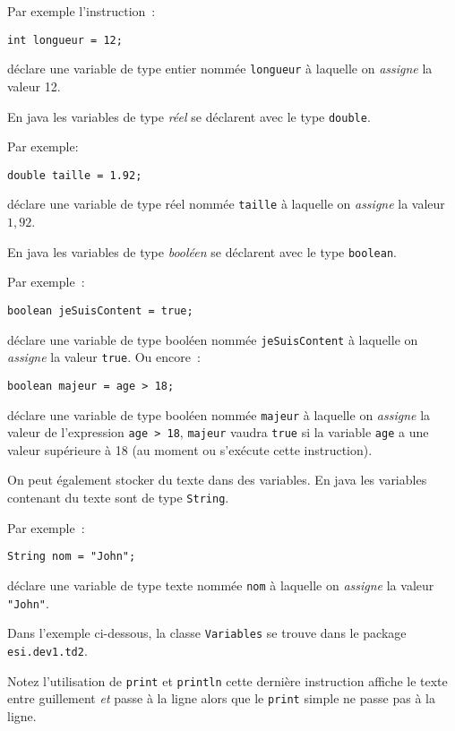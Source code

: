 \documentclass[a4paper,11pt]{article}
\begin{document}
	Par exemple l'instruction~:
	
	\texttt{int longueur = 12;}
	
	déclare une variable de type entier nommée \texttt{longueur} à laquelle on \emph{assigne}
	la valeur 12.
	
	En java les variables de type \emph{réel}  se déclarent avec le type \texttt{double}. 
	
	Par exemple:
	
	\texttt{double taille = 1.92;}
	
	déclare une variable de type réel nommée \texttt{taille} à laquelle on \emph{assigne}
	la valeur $1,92$.

	En java les variables de type \emph{booléen}  se déclarent avec le type \texttt{boolean}. 
	
	Par exemple~:
	
	\texttt{boolean jeSuisContent = true;}

	déclare une variable de type booléen nommée \texttt{jeSuisContent} à laquelle on \emph{assigne}
	la valeur \texttt{true}. Ou encore~: 
	
	\texttt{boolean majeur = age > 18;}
	
	déclare une variable de type booléen nommée \texttt{majeur} à laquelle on \emph{assigne}
	la valeur de l'expression \texttt{age > 18}, \texttt{majeur} vaudra \texttt{true} si la variable \texttt{age} 
	a une valeur supérieure à 18 (au moment ou s'exécute cette instruction). 

	On peut également stocker du texte dans des variables.
	En java les variables contenant du texte sont de type \texttt{String}.
	 
	Par exemple~:

	\texttt{String nom = "John";}

	déclare une variable de type texte nommée \texttt{nom} à laquelle on \emph{assigne}
	la valeur \texttt{"John"}.


	Dans l'exemple ci-dessous, la classe \texttt{Variables} se trouve dans le package 
	\texttt{esi.dev1.td2}.

	

	Notez l'utilisation de \texttt{print} et \texttt{println} cette dernière instruction affiche 
	le texte entre guillement
	\emph{et} passe à la ligne alors que le \texttt{print} simple ne passe pas à la ligne. 



	
	
\end{document}
